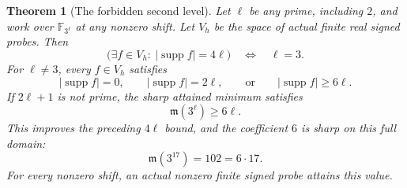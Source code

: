 \documentclass[11pt]{article}
\newtheorem{theorem}{Theorem}[section]
\begin{document}
\begin{theorem}[The forbidden second level]
\label{thm:odd-pell-forbidden-support-level}
Let \(\ell\) be any prime, including \(2\), and work over
\(\mathbb F_{3^\ell}\) at any nonzero shift.
Let \(V_h\) be the space of actual finite real signed probes.
Then
\[
 \bigl(\exists f\in V_h:\ |\operatorname{supp}f|=4\ell\bigr)
                    \quad\Longleftrightarrow\quad \ell=3.
\]
For \(\ell\ne3\), every \(f\in V_h\) satisfies
\[
 |\operatorname{supp}f|=0,\qquad
 |\operatorname{supp}f|=2\ell,\qquad\text{or}\qquad
 |\operatorname{supp}f|\ge6\ell.
\]
If \(2\ell+1\) is not prime, the sharp attained minimum satisfies
\[
                         \mathfrak m(3^\ell)\ge6\ell.
\]
This improves the preceding \(4\ell\) bound, and the coefficient
\(6\) is sharp on this full domain:
\[
                  \mathfrak m(3^{17})=102=6\cdot17.
\]
For every nonzero shift, an actual nonzero finite signed probe
attains this value.
\end{theorem}
\end{document}

